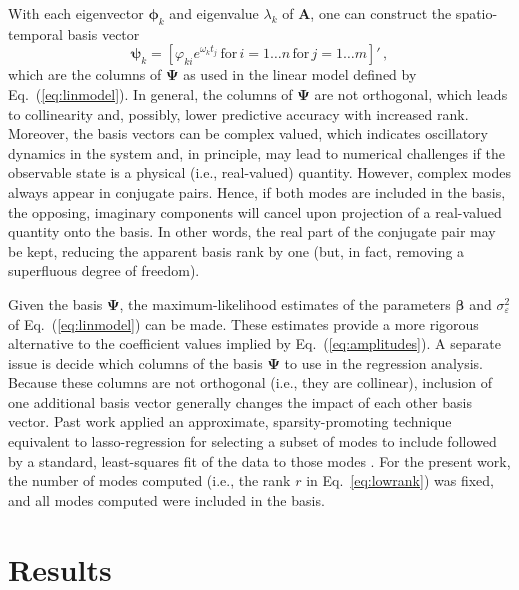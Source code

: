 \documentclass[review,number,sort&compress,12pt]{elsarticle}
\begin{document}
With each eigenvector $\boldsymbol{\phi}_k$ and eigenvalue $\lambda_k$ of $\mathbf{A}$, one can construct the spatio-temporal basis vector
\begin{equation}
  \boldsymbol{\psi}_k = 
    [\varphi_{ki} e^{\omega_k t_j} \, \text{for} \, i =1\ldots n \, \text{for} \, j = 1\ldots m]' \, ,
\end{equation}
which are the columns of $\boldsymbol{\Psi}$ as used in the linear model defined by Eq.~(\ref{eq:linmodel}).
In general, the columns of $\boldsymbol{\Psi}$ are not orthogonal, which leads to collinearity and, possibly, lower predictive accuracy with increased rank.  
Moreover, the basis vectors can be complex valued, which indicates oscillatory dynamics in the system and, in principle, may lead to  numerical challenges if the observable state is a physical (i.e., real-valued) quantity.
However, complex modes always appear in conjugate pairs. 
Hence, if both modes are included in the basis, the opposing, imaginary components will cancel upon projection of a real-valued quantity onto the basis.
In other words, the real part of the conjugate pair may be kept, reducing the apparent basis rank by one (but, in fact, removing a superfluous degree of freedom).

Given the basis $\boldsymbol{\Psi}$, the maximum-likelihood estimates of the parameters $\boldsymbol{\beta}$ and $\sigma^2_{\varepsilon}$ of Eq.~(\ref{eq:linmodel}) can be made.
These estimates provide a more rigorous alternative to the coefficient values implied by Eq.~(\ref{eq:amplitudes}).  
A separate issue is decide which columns of the basis $\boldsymbol{\Psi}$ to use in the regression analysis.
Because these columns are not orthogonal (i.e., they are collinear), inclusion of one additional basis vector generally changes the impact of each other basis vector.
Past work applied an approximate, sparsity-promoting technique equivalent to lasso-regression for selecting a subset of modes to include followed by a standard, least-squares fit of the data to those modes \cite{jovanovic}.
For the present work, the number of modes computed (i.e., the rank $r$ in Eq.~\ref{eq:lowrank}) was fixed, and all modes computed were included in the basis.


\section{Results}
\label{sec:results}
\end{document}
